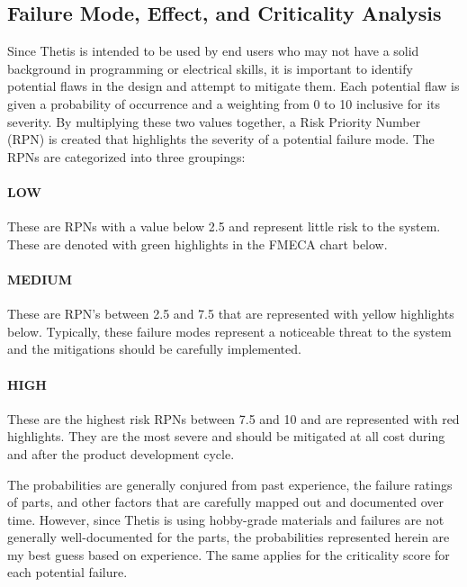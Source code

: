 \subsection{Failure Mode, Effect, and Criticality Analysis} 
Since Thetis is intended to be used by end users who may not have a solid background in programming or electrical skills, it is important to identify potential flaws in the design and attempt to mitigate them.
Each potential flaw is given a probability of occurrence and a weighting from 0 to 10 inclusive for its severity. 
By multiplying these two values together, a Risk Priority Number (RPN) is created that highlights the severity of a potential failure mode. The RPNs are categorized into three groupings:

\paragraph*{LOW} These are RPNs with a value below 2.5 and represent little risk to the system. 
These are denoted with green highlights in the FMECA chart below.

\paragraph*{MEDIUM} These are RPN's between 2.5 and 7.5 that are represented with yellow highlights below.
Typically, these failure modes represent a noticeable threat to the system and the mitigations should be carefully implemented.

\paragraph*{HIGH} These are the highest risk RPNs between 7.5 and 10 and are represented with red highlights.
They are the most severe and should be mitigated at all cost during and after the product development cycle.

The probabilities are generally conjured from past experience, the failure ratings of parts, and other factors that are carefully mapped out and documented over time.
However, since Thetis is using hobby-grade materials and failures are not generally well-documented for the parts, the probabilities represented herein are my best guess based on experience.
The same applies for the criticality score for each potential failure.

